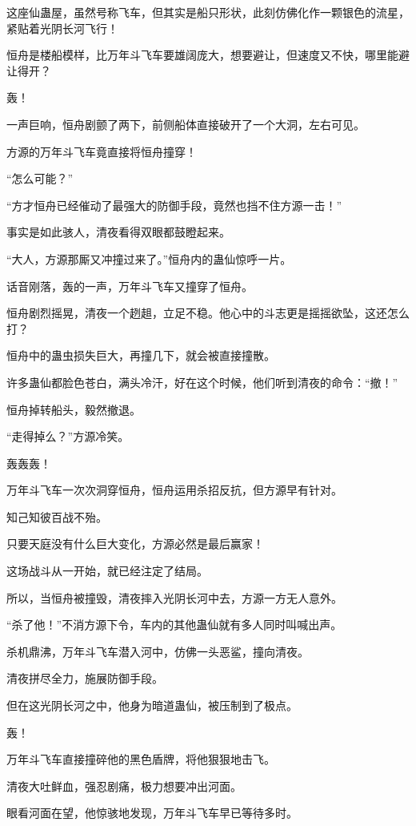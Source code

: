 \begin{this_body}
这座仙蛊屋，虽然号称飞车，但其实是船只形状，此刻仿佛化作一颗银色的流星，紧贴着光阴长河飞行！

恒舟是楼船模样，比万年斗飞车要雄阔庞大，想要避让，但速度又不快，哪里能避让得开？

轰！

一声巨响，恒舟剧颤了两下，前侧船体直接破开了一个大洞，左右可见。

方源的万年斗飞车竟直接将恒舟撞穿！

“怎么可能？”

“方才恒舟已经催动了最强大的防御手段，竟然也挡不住方源一击！”

事实是如此骇人，清夜看得双眼都鼓瞪起来。

“大人，方源那厮又冲撞过来了。”恒舟内的蛊仙惊呼一片。

话音刚落，轰的一声，万年斗飞车又撞穿了恒舟。

恒舟剧烈摇晃，清夜一个趔趄，立足不稳。他心中的斗志更是摇摇欲坠，这还怎么打？

恒舟中的蛊虫损失巨大，再撞几下，就会被直接撞散。

许多蛊仙都脸色苍白，满头冷汗，好在这个时候，他们听到清夜的命令：“撤！”

恒舟掉转船头，毅然撤退。

“走得掉么？”方源冷笑。

轰轰轰！

万年斗飞车一次次洞穿恒舟，恒舟运用杀招反抗，但方源早有针对。

知己知彼百战不殆。

只要天庭没有什么巨大变化，方源必然是最后赢家！

这场战斗从一开始，就已经注定了结局。

所以，当恒舟被撞毁，清夜摔入光阴长河中去，方源一方无人意外。

“杀了他！”不消方源下令，车内的其他蛊仙就有多人同时叫喊出声。

杀机鼎沸，万年斗飞车潜入河中，仿佛一头恶鲨，撞向清夜。

清夜拼尽全力，施展防御手段。

但在这光阴长河之中，他身为暗道蛊仙，被压制到了极点。

轰！

万年斗飞车直接撞碎他的黑色盾牌，将他狠狠地击飞。

清夜大吐鲜血，强忍剧痛，极力想要冲出河面。

眼看河面在望，他惊骇地发现，万年斗飞车早已等待多时。


\end{this_body}
